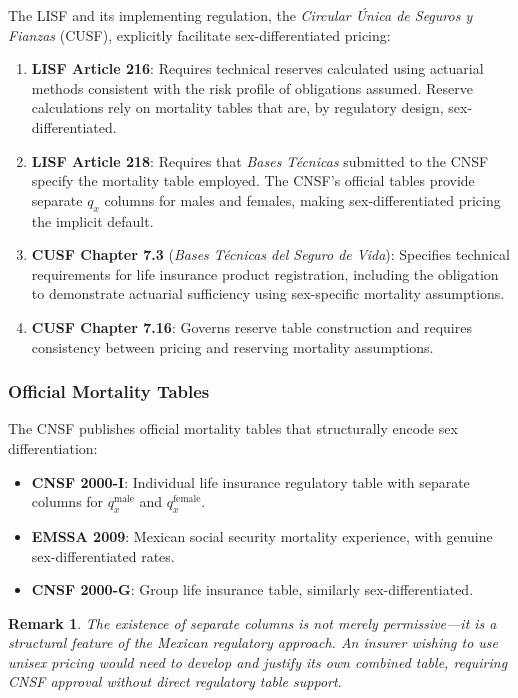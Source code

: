 \documentclass[12pt,a4paper]{article}
\newtheorem{remark}[definition]{Remark}
\newcommand{\qx}[1]{q_{#1}}
\begin{document}
The LISF and its implementing regulation, the \emph{Circular \'{U}nica de Seguros y Fianzas} (CUSF), explicitly facilitate sex-differentiated pricing:

\begin{enumerate}
  \item \textbf{LISF Article 216}: Requires technical reserves calculated using actuarial methods consistent with the risk profile of obligations assumed. Reserve calculations rely on mortality tables that are, by regulatory design, sex-differentiated.

  \item \textbf{LISF Article 218}: Requires that \emph{Bases T\'{e}cnicas} submitted to the CNSF specify the mortality table employed. The CNSF's official tables provide separate $\qx{x}$ columns for males and females, making sex-differentiated pricing the implicit default.

  \item \textbf{CUSF Chapter 7.3} (\emph{Bases T\'{e}cnicas del Seguro de Vida}): Specifies technical requirements for life insurance product registration, including the obligation to demonstrate actuarial sufficiency using sex-specific mortality assumptions.

  \item \textbf{CUSF Chapter 7.16}: Governs reserve table construction and requires consistency between pricing and reserving mortality assumptions.
\end{enumerate}

\subsubsection{Official Mortality Tables}

The CNSF publishes official mortality tables that structurally encode sex differentiation:
\begin{itemize}
  \item \textbf{CNSF 2000-I}: Individual life insurance regulatory table with separate columns for $\qx{x}^{\text{male}}$ and $\qx{x}^{\text{female}}$.
  \item \textbf{EMSSA 2009}: Mexican social security mortality experience, with genuine sex-differentiated rates.
  \item \textbf{CNSF 2000-G}: Group life insurance table, similarly sex-differentiated.
\end{itemize}

\begin{remark}
The existence of separate columns is not merely permissive---it is a \emph{structural feature} of the Mexican regulatory approach. An insurer wishing to use unisex pricing would need to develop and justify its own combined table, requiring CNSF approval without direct regulatory table support.
\end{remark}
\end{document}
